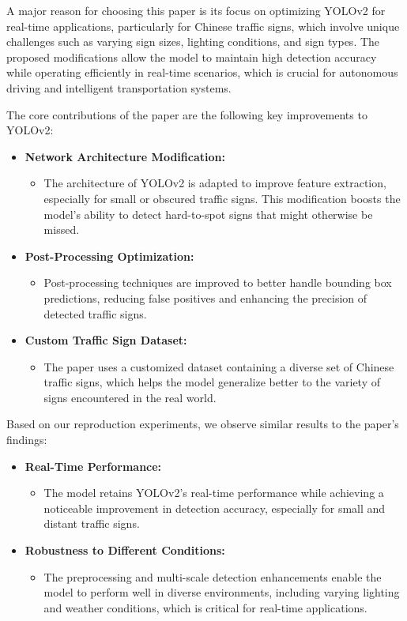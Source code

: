 \documentclass[letterpaper, 10 pt, conference]{ieeeconf}
\begin{document}
A major reason for choosing this paper is its focus on optimizing YOLOv2 for real-time applications, particularly for Chinese traffic signs, which involve unique challenges such as varying sign sizes, lighting conditions, and sign types. The proposed modifications allow the model to maintain high detection accuracy while operating efficiently in real-time scenarios, which is crucial for autonomous driving and intelligent transportation systems.

The core contributions of the paper are the following key improvements to YOLOv2:
\begin{itemize}
    \item \textbf{Network Architecture Modification:}
    \begin{itemize}
        \item The architecture of YOLOv2 is adapted to improve feature extraction, especially for small or obscured traffic signs. This modification boosts the model's ability to detect hard-to-spot signs that might otherwise be missed.
    \end{itemize}
    \item \textbf{Post-Processing Optimization:}
    \begin{itemize}
        \item Post-processing techniques are improved to better handle bounding box predictions, reducing false positives and enhancing the precision of detected traffic signs.
    \end{itemize}
    \item \textbf{Custom Traffic Sign Dataset:}
    \begin{itemize}
        \item The paper uses a customized dataset containing a diverse set of Chinese traffic signs, which helps the model generalize better to the variety of signs encountered in the real world.
    \end{itemize}
\end{itemize}
Based on our reproduction experiments, we observe similar results to the paper's findings:
\begin{itemize}
    \item \textbf{Real-Time Performance:}
    \begin{itemize}
        \item The model retains YOLOv2's real-time performance while achieving a noticeable improvement in detection accuracy, especially for small and distant traffic signs.
    \end{itemize}
    \item \textbf{Robustness to Different Conditions:}
    \begin{itemize}
        \item The preprocessing and multi-scale detection enhancements enable the model to perform well in diverse environments, including varying lighting and weather conditions, which is critical for real-time applications.
    \end{itemize}
\end{itemize}
\end{document}
